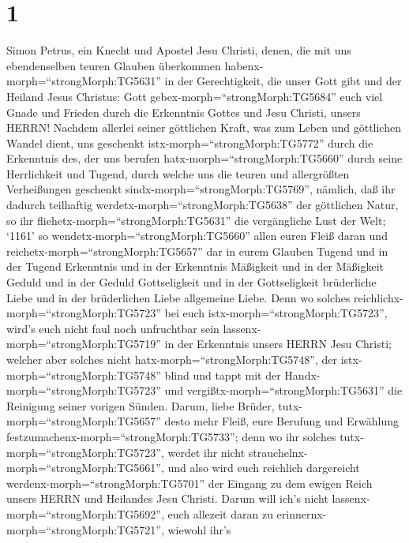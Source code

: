 \hypertarget{section}{%
\section{1}\label{section}}

 Simon Petrus, ein Knecht und Apostel Jesu Christi, denen,
die mit uns ebendenselben teuren Glauben überkommen
habenx-morph=``strongMorph:TG5631'' in der Gerechtigkeit, die unser Gott
gibt und der Heiland Jesus Christus:  Gott
gebex-morph=``strongMorph:TG5684'' euch viel Gnade und Frieden durch die
Erkenntnis Gottes und Jesu Christi, unsers HERRN!  Nachdem
allerlei seiner göttlichen Kraft, was zum Leben und göttlichen Wandel
dient, uns geschenkt istx-morph=``strongMorph:TG5772'' durch die
Erkenntnis des, der uns berufen hatx-morph=``strongMorph:TG5660'' durch
seine Herrlichkeit und Tugend,  durch welche uns die teuren
und allergrößten Verheißungen geschenkt
sindx-morph=``strongMorph:TG5769'', nämlich, daß ihr dadurch teilhaftig
werdetx-morph=``strongMorph:TG5638'' der göttlichen Natur, so ihr
fliehetx-morph=``strongMorph:TG5631'' die vergängliche Lust der Welt;
 `1161' so wendetx-morph=``strongMorph:TG5660'' allen euren
Fleiß daran und reichetx-morph=``strongMorph:TG5657'' dar in eurem
Glauben Tugend und in der Tugend Erkenntnis  und in der
Erkenntnis Mäßigkeit und in der Mäßigkeit Geduld und in der Geduld
Gottseligkeit  und in der Gottseligkeit brüderliche Liebe
und in der brüderlichen Liebe allgemeine Liebe.  Denn wo
solches reichlichx-morph=``strongMorph:TG5723'' bei euch
istx-morph=``strongMorph:TG5723'', wird's euch nicht faul noch
unfruchtbar sein lassenx-morph=``strongMorph:TG5719'' in der Erkenntnis
unsers HERRN Jesu Christi;  welcher aber solches nicht
hatx-morph=``strongMorph:TG5748'', der istx-morph=``strongMorph:TG5748''
blind und tappt mit der Handx-morph=``strongMorph:TG5723'' und
vergißtx-morph=``strongMorph:TG5631'' die Reinigung seiner vorigen
Sünden.  Darum, liebe Brüder,
tutx-morph=``strongMorph:TG5657'' desto mehr Fleiß, eure Berufung und
Erwählung festzumachenx-morph=``strongMorph:TG5733''; denn wo ihr
solches tutx-morph=``strongMorph:TG5723'', werdet ihr nicht
strauchelnx-morph=``strongMorph:TG5661'',  und also wird
euch reichlich dargereicht werdenx-morph=``strongMorph:TG5701'' der
Eingang zu dem ewigen Reich unsers HERRN und Heilandes Jesu Christi.
 Darum will ich's nicht
lassenx-morph=``strongMorph:TG5692'', euch allezeit daran zu
erinnernx-morph=``strongMorph:TG5721'', wiewohl ihr's
